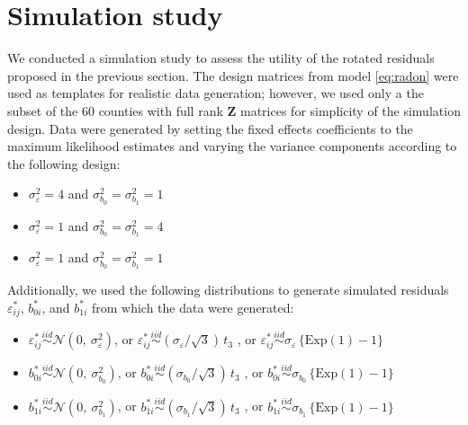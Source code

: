 \documentclass{article} %
\begin{document}
\section{Simulation study}\label{sec:simulation}

We conducted a simulation study to assess the utility of the rotated residuals proposed in the previous section. The design matrices from model \eqref{eq:radon} were used as templates for realistic data generation; however, we used only a the subset of the 60 counties with full rank $\bm{Z}$ matrices for simplicity of the simulation design.
Data were generated by setting the fixed effects coefficients to the maximum likelihood estimates and varying the variance components according to the following design:
%
\begin{itemize}
\item $\sigma^2_\varepsilon = 4$ and  $\sigma^2_{b_0} = \sigma^2_{b_1} = 1$
\item $\sigma^2_\varepsilon = 1$ and  $\sigma^2_{b_0} = \sigma^2_{b_1} = 4$
\item $\sigma^2_\varepsilon = 1$ and  $\sigma^2_{b_0} = \sigma^2_{b_1} = 1$
\end{itemize}
%
Additionally, we used the following distributions to generate simulated residuals $\varepsilon_{ij}^*$, $b_{0i}^*$, and $b_{1i}^*$ from which the data were generated:
%
\begin{itemize}
\item $\varepsilon_{ij}^* \overset{iid}{\sim} \mathcal{N}(0, \ \sigma^2_{\varepsilon})$, or $\varepsilon_{ij}^* \overset{iid}{\sim} (\sigma_{\varepsilon} / \sqrt{3})\, t_3$ , or $\varepsilon_{ij}^* \overset{iid}{\sim} \sigma_{\varepsilon} \, \{ \text{Exp}(1) - 1 \}$

\item $b_{0i}^* \overset{iid}{\sim} \mathcal{N}(0, \ \sigma^2_{b_{0}})$, or $b_{0i}^* \overset{iid}{\sim} (\sigma_{b_{0}} / \sqrt{3})\, t_3$ , or $b_{0i}^* \overset{iid}{\sim} \sigma_{b_{0}} \, \{ \text{Exp}(1) - 1 \}$

\item $b_{1i}^* \overset{iid}{\sim} \mathcal{N}(0, \ \sigma^2_{b_{1}})$, or $b_{1i}^* \overset{iid}{\sim} (\sigma_{b_{1}} / \sqrt{3})\, t_3$ , or $b_{1i}^* \overset{iid}{\sim} \sigma_{b_{1}} \, \{ \text{Exp}(1) - 1 \}$
\end{itemize}
\end{document}
